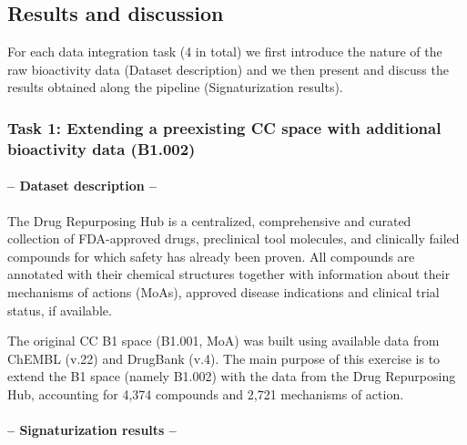 \subsection{Results and discussion}


For each data integration task (4 in total) we first introduce the nature of the raw bioactivity data (Dataset description) and we then present and discuss the results obtained along the pipeline (Signaturization results). 




\subsubsection{Task 1: Extending a preexisting CC space with additional bioactivity data (B1.002)}

\paragraph{-- Dataset description --} \leavevmode

The Drug Repurposing Hub\cite{corsello_drug_2017} is a centralized, comprehensive and curated collection of FDA-approved drugs, preclinical tool molecules, and clinically failed compounds for which safety has already been proven. All compounds are annotated with their chemical structures together with information about their mechanisms of actions (MoAs), approved disease indications and clinical trial status, if available.

The original CC B1 space (B1.001, MoA) was built using available data from ChEMBL (v.22) and DrugBank (v.4). The main purpose of this exercise is to extend the B1 space (namely B1.002) with the data from the Drug Repurposing Hub, accounting for 4,374 compounds and 2,721 mechanisms of action.

\paragraph{-- Signaturization results --}  \leavevmode

